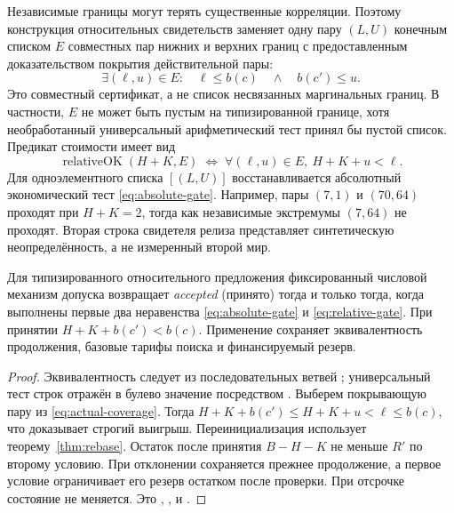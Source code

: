Независимые границы могут терять существенные корреляции. Поэтому конструкция относительных свидетельств заменяет одну пару $(L,U)$ конечным списком $E$ совместных пар нижних и верхних границ с предоставленным доказательством покрытия действительной пары:
\begin{equation}\label{eq:actual-coverage}
 \exists (\ell,u)\in E:\quad \ell\le b(c)\quad\land\quad b(c')\le u.
\end{equation}
Это совместный сертификат, а не список несвязанных маргинальных границ. В частности, $E$ не может быть пустым на типизированной границе, хотя необработанный универсальный арифметический тест принял бы пустой список. Предикат стоимости имеет вид
\begin{equation}\label{eq:relative-gate}
 \operatorname{relativeOK}(H+K,E)\;\Longleftrightarrow\;
 \forall(\ell,u)\in E,\ H+K+u<\ell.
\end{equation}
Для одноэлементного списка $[(L,U)]$ восстанавливается абсолютный экономический тест \eqref{eq:absolute-gate}. Например, пары $(7,1)$ и $(70,64)$ проходят при $H+K=2$, тогда как независимые экстремумы $(7,64)$ не проходят. Вторая строка свидетеля релиза представляет синтетическую неопределённость, а не измеренный второй мир.

\begin{theorem}\label{thm:gate}
Для типизированного относительного предложения фиксированный числовой механизм допуска возвращает \emph{accepted} (принято) тогда и только тогда, когда выполнены первые два неравенства \eqref{eq:absolute-gate} и \eqref{eq:relative-gate}. При принятии $H+K+b(c')<b(c)$. Применение сохраняет эквивалентность продолжения, базовые тарифы поиска и финансируемый резерв.
\end{theorem}
\begin{proof}
Эквивалентность следует из последовательных ветвей ; универсальный тест строк отражён в булево значение посредством . Выберем покрывающую пару из \eqref{eq:actual-coverage}. Тогда $H+K+b(c')\le H+K+u<\ell\le b(c)$, что доказывает строгий выигрыш. Переинициализация использует теорему~\ref{thm:rebase}. Остаток после принятия $B-H-K$ не меньше $R'$ по второму условию. При отклонении сохраняется прежнее продолжение, а первое условие ограничивает его резерв остатком после проверки. При отсрочке состояние не меняется. Это , ,  и .
\end{proof}

